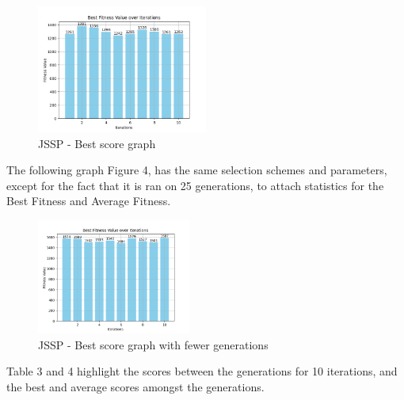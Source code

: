 \documentclass[12pt]{article}
\begin{document}
\begin{figure}[h]
    \centering
    \includegraphics[width=0.5\textwidth]{images/Figure_2.png}
    \caption{JSSP - Best score graph}
\end{figure}

The following graph Figure 4, has the same selection schemes and parameters, except for the fact that it is ran on 25 generations, to attach statistics for the Best Fitness and Average Fitness.

\begin{figure}[h]
    \centering
    \includegraphics[width=0.45\textwidth]{images/JSSP_rntrbestscorelessgens.png}
    \caption{JSSP - Best score graph with fewer generations}
\end{figure}

Table 3 and 4 highlight the scores between the generations for 10 iterations, and the best and average scores amongst the generations. 

\newpage
\end{document}
